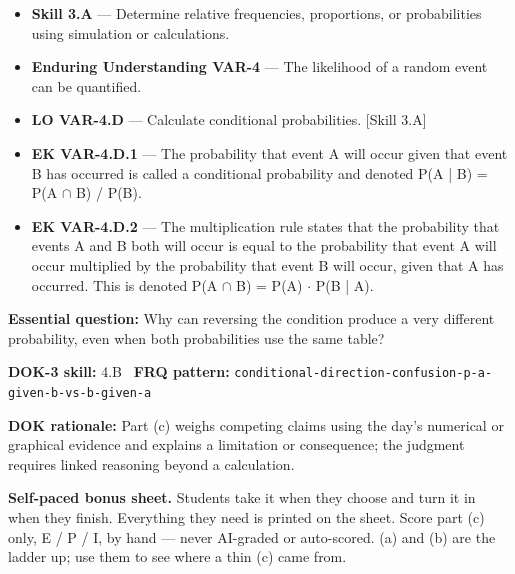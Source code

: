 \documentclass[11pt]{article}
\begin{document}


{\small
\begin{itemize}[leftmargin=1.5em,itemsep=2pt,topsep=2pt]
  \item \textbf{Skill 3.A} --- Determine relative frequencies, proportions, or probabilities using simulation or calculations.
  \item \textbf{Enduring Understanding VAR-4} --- The likelihood of a random event can be quantified.
  \item \textbf{LO VAR-4.D} --- Calculate conditional probabilities. [Skill 3.A]
  \item \textbf{EK VAR-4.D.1} --- The probability that event A will occur given that event B has occurred is called a conditional probability and denoted P(A | B) = P(A $\cap$ B) / P(B).
  \item \textbf{EK VAR-4.D.2} --- The multiplication rule states that the probability that events A and B both will occur is equal to the probability that event A will occur multiplied by the probability that event B will occur, given that A has occurred. This is denoted P(A $\cap$ B) = P(A) $\cdot$ P(B | A).
\end{itemize}
}
\textbf{Essential question:} Why can reversing the condition produce a very different probability, even when both probabilities use the same table?\par
\textbf{DOK-3 skill:} 4.B \textperiodcentered\ \textbf{FRQ pattern:} {\small\texttt{conditional-\allowbreak{}direction-\allowbreak{}confusion-\allowbreak{}p-\allowbreak{}a-\allowbreak{}given-\allowbreak{}b-\allowbreak{}vs-\allowbreak{}b-\allowbreak{}given-\allowbreak{}a}}\par
\textbf{DOK rationale:} Part (c) weighs competing claims using the day's numerical or graphical evidence and explains a limitation or consequence; the judgment requires linked reasoning beyond a calculation.\par

\textbf{Self-paced bonus sheet.} Students take it when they choose and turn it in when they finish. Everything they need is printed on the sheet. Score part (c) only, E / P / I, by hand --- never AI-graded or auto-scored. (a) and (b) are the ladder up; use them to see where a thin (c) came from.\par
\end{document}

